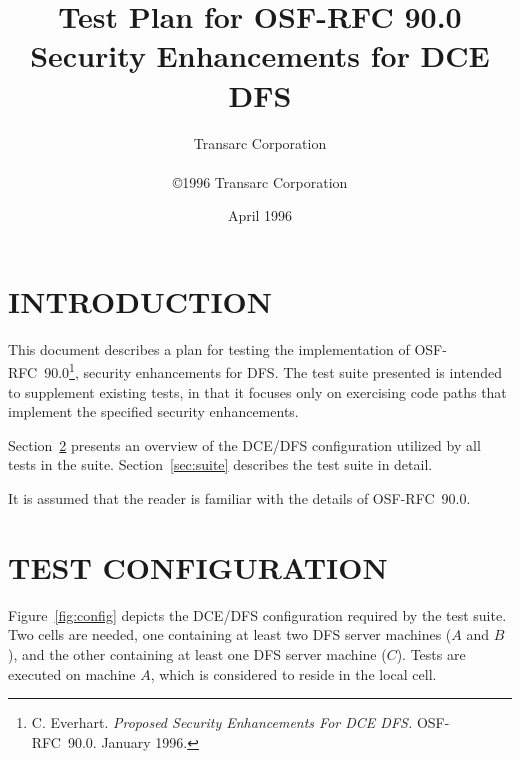 



\title{Test Plan for OSF-RFC 90.0\\
Security Enhancements for DCE DFS}

\author{Transarc Corporation\\
\\
\copyright 1996 Transarc Corporation}
\date{April 1996}

\maketitle

%
%

\section{INTRODUCTION}

This document describes a plan for testing the implementation
of OSF-RFC~90.0\footnote{C. Everhart. {\em Proposed Security Enhancements
For DCE DFS.} OSF-RFC~90.0.  January 1996.}, security enhancements for DFS.
The test suite presented is intended to supplement existing
tests, in that it focuses only on exercising code paths that implement
the specified security enhancements.

Section~\ref{sec:config} presents an overview of the DCE/DFS configuration
utilized by all tests in the suite.
Section~\ref{sec:suite} describes the test suite in detail.

It is assumed that the reader is familiar with the details of OSF-RFC~90.0.

%
%

\section{TEST CONFIGURATION}
\label{sec:config}

Figure~\ref{fig:config} depicts the DCE/DFS configuration required by
the test suite.  Two cells are needed,
one containing at least two DFS server machines ($A$ and $B$),
and the other containing at least one DFS server machine ($C$).
Tests are executed on machine $A$, which is considered to reside
in the local cell.

